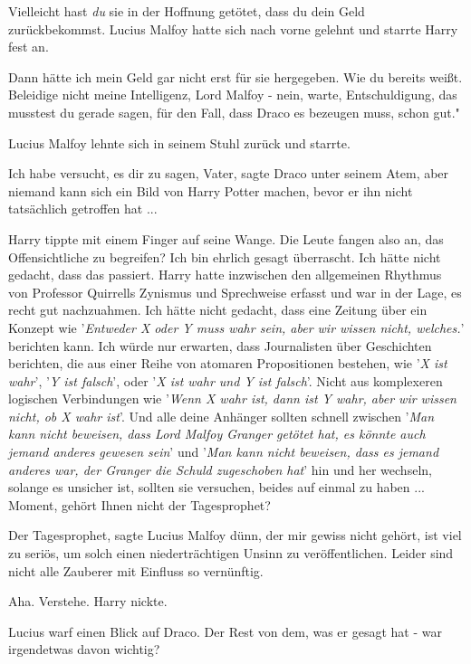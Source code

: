 \glqq{}Vielleicht hast \emph{du} sie in der Hoffnung getötet, dass du dein Geld
zurückbekommst.\grqq{} Lucius Malfoy hatte sich nach vorne gelehnt und starrte
Harry fest an.

\glqq{}Dann hätte ich mein Geld gar nicht erst für sie hergegeben. Wie du bereits
weißt. Beleidige nicht meine Intelligenz, Lord Malfoy - nein, warte,
Entschuldigung, das musstest du gerade sagen, für den Fall, dass Draco es
bezeugen muss, schon gut."

Lucius Malfoy lehnte sich in seinem Stuhl zurück und starrte.

\glqq{}Ich habe versucht, es dir zu sagen, Vater\grqq{}, sagte Draco unter seinem
Atem, \glqq{}aber niemand kann sich ein Bild von Harry Potter machen, bevor er
ihn nicht tatsächlich getroffen hat ...\grqq{}

Harry tippte mit einem Finger auf seine Wange. \glqq{}Die Leute fangen also an,
das Offensichtliche zu begreifen? Ich bin ehrlich gesagt überrascht. Ich hätte
nicht gedacht, dass das passiert.\grqq{} Harry hatte inzwischen den allgemeinen
Rhythmus von Professor Quirrells Zynismus und Sprechweise erfasst und war in der
Lage, es recht gut nachzuahmen. \glqq{}Ich hätte nicht gedacht, dass eine Zeitung
über ein Konzept wie '\emph{Entweder X oder Y muss wahr sein, aber wir wissen
nicht, welches.}' berichten kann. Ich würde nur erwarten, dass Journalisten über
Geschichten berichten, die aus einer Reihe von atomaren Propositionen bestehen,
wie '\emph{X ist wahr}', '\emph{Y ist falsch}', oder '\emph{X ist wahr und Y ist
falsch}'. Nicht aus komplexeren logischen Verbindungen wie '\emph{Wenn X wahr
ist, dann ist Y wahr, aber wir wissen nicht, ob X wahr ist}'. Und alle deine
Anhänger sollten schnell zwischen '\emph{Man kann nicht beweisen, dass Lord
Malfoy Granger getötet hat, es könnte auch jemand anderes gewesen sein}' und
'\emph{Man kann nicht beweisen, dass es jemand anderes war, der Granger die
Schuld zugeschoben hat}' hin und her wechseln, solange es unsicher ist, sollten
sie versuchen, beides auf einmal zu haben ... Moment, gehört Ihnen nicht der
Tagesprophet?\grqq{}

\glqq{}Der Tagesprophet\grqq{}, sagte Lucius Malfoy dünn, \glqq{}der mir gewiss
nicht gehört, ist viel zu seriös, um solch einen niederträchtigen Unsinn zu
veröffentlichen. Leider sind nicht alle Zauberer mit Einfluss so
vernünftig.\grqq{}

\glqq{}Aha. Verstehe.\grqq{} Harry nickte.

Lucius warf einen Blick auf Draco. \glqq{}Der Rest von dem, was er gesagt hat -
war irgendetwas davon wichtig?\grqq{}

